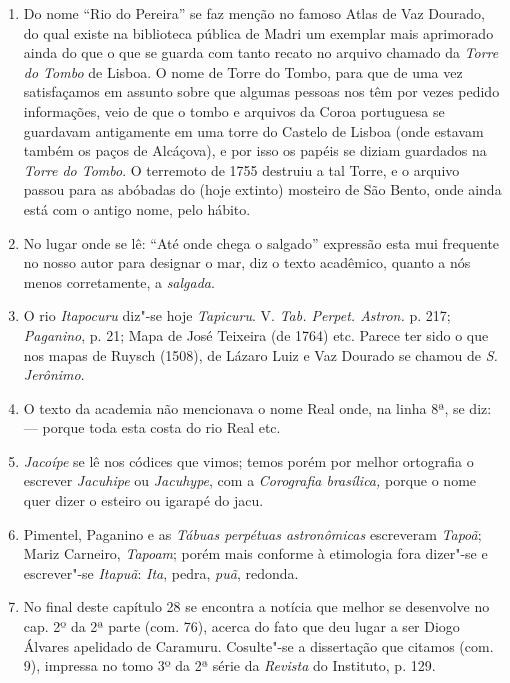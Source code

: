 \begin{enumerate}
\item Do nome ``Rio do Pereira'' se faz menção no famoso Atlas de Vaz Dourado, do qual 
existe na biblioteca pública de Madri um exemplar mais aprimorado ainda do que o que 
se guarda com tanto recato no arquivo chamado da \textit{Torre do Tombo} de Lisboa. O nome 
de Torre do Tombo, para que de uma vez satisfaçamos em assunto sobre que algumas 
pessoas nos têm por vezes pedido informações, veio de que o tombo e arquivos da 
Coroa portuguesa se guardavam antigamente em uma torre do Castelo de Lisboa 
(onde estavam também os paços de Alcáçova), e por isso os papéis se diziam guardados na \textit{Torre 
do Tombo}. O terremoto de 1755 destruiu a tal Torre, e o arquivo passou para as abóbadas do 
(hoje extinto) mosteiro de São Bento, onde ainda está com o antigo nome, pelo hábito.

\item No lugar onde se lê: ``Até onde chega o salgado''  expressão esta mui frequente no 
nosso autor para designar o mar, diz o texto acadêmico, quanto a nós menos 
corretamente, a \textit{salgada}.

\item O rio \textit{Itapocuru} diz"-se hoje \textit{Tapicuru}. V. \textit{Tab. Perpet. Astron.} p. 217; \textit{Paganino}, p. 
21; Mapa de José Teixeira (de 1764) etc. Parece ter sido o que nos mapas de Ruysch 
(1508), de Lázaro Luiz e Vaz Dourado se chamou de \textit{S. Jerônimo}.

\item O texto da academia não mencionava o nome Real onde, na linha 8ª, se diz: --- porque toda esta costa do rio Real etc.

\item  \textit{Jacoípe} se lê nos códices que vimos; temos porém por melhor ortografia o escrever 
\textit{Jacuhipe} ou \textit{Jacuhype}, com a \textit{Corografia brasílica,} porque o nome quer dizer o esteiro ou igarapé do jacu.

\item Pimentel, Paganino e as \textit{Tábuas perpétuas astronômicas} escreveram \textit{Tapoã}; Mariz 
Carneiro, \textit{Tapoam}; porém mais conforme à etimologia fora dizer"-se e escrever"-se 
\textit{Itapuã}: \textit{Ita}, pedra, \textit{puã}, redonda.

\item No final deste capítulo 28 se encontra a notícia que melhor se desenvolve no cap. 
2º da 2ª parte (com. 76), acerca do fato que deu lugar a ser Diogo Álvares apelidado 
de Caramuru. Cosulte"-se a dissertação que citamos (com. 9), impressa no tomo 3º da 
2ª série da \textit{Revista} do Instituto, p. 129.


\end{enumerate}
